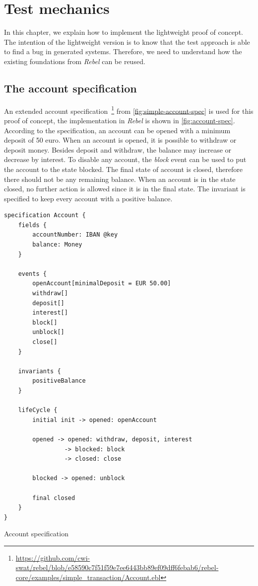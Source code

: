 \chapter{Test mechanics}\label{sec:ch3}

In this chapter, we explain how to implement the lightweight proof of concept. The intention of the lightweight version is to know that the test approach is able to find a bug in generated systems. Therefore, we need to understand how the existing foundations from \textit{Rebel} can be reused.


\section{The account specification}
An extended account specification~\footnote{\url{https://github.com/cwi-swat/rebel/blob/e58590c7f51f59e7ee6443bb89ef09dff6febab6/rebel-core/examples/simple_transaction/Account.ebl}} from \autoref{fig:simple-account-spec} is used for this proof of concept, the implementation in \textit{Rebel} is shown in \autoref{fig:account-spec}. According to the specification, an account can be opened with a minimum deposit of 50 euro. When an account is opened, it is possible to withdraw or deposit money. Besides deposit and withdraw, the balance may increase or decrease by interest. To disable any account, the \textit{block} event can be used to put the account to the state blocked. The final state of account is closed, therefore there should not be any remaining balance. When an account is in the state closed, no further action is allowed since it is in the final state. The invariant is specified to keep every account with a positive balance.


\begin{sourcecode}[h!]
\begin{lstlisting}[]
specification Account {
	fields {
		accountNumber: IBAN @key
		balance: Money
	}

	events {
		openAccount[minimalDeposit = EUR 50.00]
		withdraw[]
		deposit[]
		interest[]
		block[]
		unblock[]
		close[]
	}

	invariants {
		positiveBalance
	}

	lifeCycle {
		initial init -> opened: openAccount

		opened -> opened: withdraw, deposit, interest
			     -> blocked: block
			     -> closed: close

		blocked -> opened: unblock

		final closed
	}
}
\end{lstlisting}
\caption{Account specification}\label{fig:account-spec}
\end{sourcecode}
\FloatBarrier

